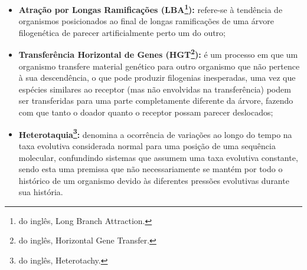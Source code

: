 \documentclass[english,brazilian]{UNISINOSmonografia} %
\begin{document}
\begin{itemize}
	
	\item \textbf{Atração por Longas Ramificações (LBA\footnote{do inglês, Long Branch Attraction.}):}
	refere-se à tendência de organismos posicionados ao final de longas ramificações de uma árvore filogenética de parecer artificialmente perto um do outro;
	
	\item \textbf{Transferência Horizontal de Genes (HGT\footnote{do inglês, Horizontal Gene Transfer.}):}
	é um processo em que um organismo transfere material genético para outro organismo que não pertence à sua descendência, o que pode produzir filogenias inesperadas, uma vez que espécies similares ao receptor (mas não envolvidas na transferência) podem ser transferidas para uma parte completamente diferente da árvore, fazendo com que tanto o doador quanto o receptor possam parecer deslocados;
	
	\item \textbf{Heterotaquia\footnote{do inglês, Heterotachy.}:} 
	denomina a ocorrência de variações ao longo do tempo na taxa evolutiva considerada normal para uma posição de uma sequência molecular, confundindo sistemas que assumem uma taxa evolutiva constante, sendo esta uma premissa que não necessariamente se mantém por todo o histórico de um organismo devido às diferentes pressões evolutivas durante sua história.

\end{itemize}
\end{document}
